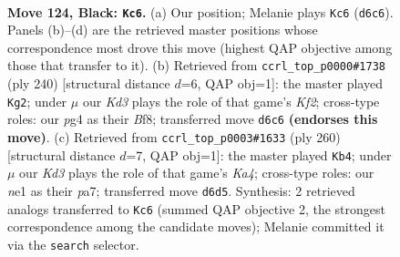 \documentclass[11pt]{article}
\begin{document}
\clearpage

\begin{figure}[p]\centering
\begin{subfigure}{0.46\textwidth}\centering
\resizebox{\linewidth}{!}{%
\newchessgame
\chessboard[
  setfen={8/R7/3k1K2/8/6P1/8/8/1r2N3 b - - 32 124},
  showmover=false,
  pgfstyle=straightmove, color=movearrow, markmove={d6-c6}
]}
\caption{}
\end{subfigure}\hfill
\begin{subfigure}{0.46\textwidth}\centering
\resizebox{\linewidth}{!}{%
\newchessgame
\chessboard[
  setfen={5B2/R7/8/5k2/2n5/8/5K2/7r w - - 14 121},
  showmover=false,
  pgfstyle=straightmove, color=movearrow, markmove={f2-g2}
]}
\caption{}
\end{subfigure}
\\[4pt]
\begin{subfigure}{0.46\textwidth}\centering
\resizebox{\linewidth}{!}{%
\newchessgame
\chessboard[
  setfen={8/p7/P2k4/7r/K7/2R5/8/8 w - - 2 131},
  showmover=false,
  pgfstyle=straightmove, color=movearrow, markmove={a4-b4}
]}
\caption{}
\end{subfigure}\hfill

\caption{\textbf{Move 124, Black: \texttt{Kc6}.} (a) Our position; Melanie plays \texttt{Kc6} (\texttt{d6c6}). Panels (b)--(d) are the retrieved master positions whose correspondence most drove this move (highest QAP objective among those that transfer to it). (b) Retrieved from \texttt{ccrl\_top\_p0000\#1738} (ply 240) [structural distance $d$=6, QAP obj=1]: the master played \texttt{Kg2}; under $\mu$ our \emph{Kd3} plays the role of that game's \emph{Kf2}; cross-type roles: our \emph{p}g4 as their \emph{B}f8; transferred move \texttt{d6c6} \textbf{(endorses this move)}. (c) Retrieved from \texttt{ccrl\_top\_p0003\#1633} (ply 260) [structural distance $d$=7, QAP obj=1]: the master played \texttt{Kb4}; under $\mu$ our \emph{Kd3} plays the role of that game's \emph{Ka4}; cross-type roles: our \emph{n}e1 as their \emph{p}a7; transferred move \texttt{d6d5}. Synthesis: 2 retrieved analogs transferred to \texttt{Kc6} (summed QAP objective 2, the strongest correspondence among the candidate moves); Melanie committed it via the \texttt{search} selector.}
\label{fig:thought-m247}
\end{figure}

\clearpage
\end{document}
